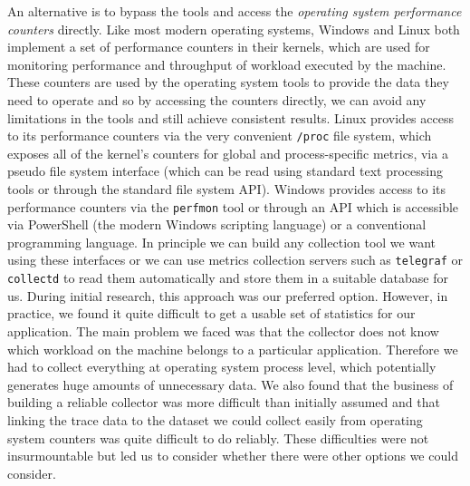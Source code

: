 An alternative is to bypass the tools and access the \emph{operating system performance counters} directly.  Like most modern operating systems, Windows and Linux both implement a set of performance counters in their kernels, which are used for monitoring performance and throughput of workload executed by the machine.  These counters are used by the operating system tools to provide the data they need to operate and so by accessing the counters directly, we can avoid any limitations in the tools and still achieve consistent results.  Linux provides access to its performance counters via the very convenient \texttt{{/proc}} file system, which exposes all of the kernel's counters for global and process-specific metrics, via a pseudo file system interface (which can be read using standard text processing tools or through the standard file system API).  Windows provides access to its performance counters via the \texttt{perfmon} tool or through an API which is accessible via PowerShell (the modern Windows scripting language) or a conventional programming language.  In principle we can build any collection tool we want using these interfaces or we can use metrics collection servers such as \texttt{telegraf} or \texttt{collectd} \cite{telegraf2018, collectd2018} to read them automatically and store them in a suitable database for us.  During initial research, this approach was our preferred option. However, in practice, we found it quite difficult to get a usable set of statistics for our application.  The main problem we faced was that the collector does not know which workload on the machine belongs to a particular application.  Therefore we had to collect everything at operating system process level, which potentially generates huge amounts of unnecessary data.  We also found that the business of building a reliable collector was more difficult than initially assumed and that linking the trace data to the dataset we could collect easily from operating system counters was quite difficult to do reliably.  These difficulties were not insurmountable but led us to consider whether there were other options we could consider.

